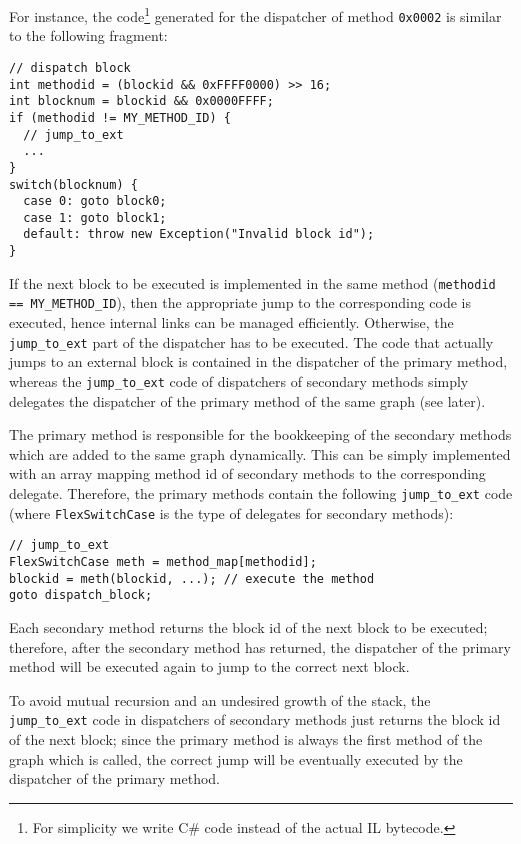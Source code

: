 For instance, the code\footnote{For simplicity we write C\# code instead of
the actual IL bytecode.} generated for the dispatcher of method \texttt{0x0002}
is similar to the following fragment: 
\begin{small}
\begin{lstlisting}[language={[Sharp]C}]
// dispatch block
int methodid = (blockid && 0xFFFF0000) >> 16; 
int blocknum = blockid && 0x0000FFFF;         
if (methodid != MY_METHOD_ID) {
  // jump_to_ext 
  ...
}
switch(blocknum) {
  case 0: goto block0;
  case 1: goto block1;
  default: throw new Exception("Invalid block id");
}
\end{lstlisting}
\end{small}
If the next block to be executed is implemented in the same method
({\small\lstinline{methodid == MY_METHOD_ID}}), then the appropriate
jump to the corresponding code is executed, hence internal links
can be managed efficiently.
Otherwise, the \lstinline{jump_to_ext}
part of the dispatcher has to be executed.
The code that actually jumps to an external block is contained in
the dispatcher of the primary method, whereas the
\lstinline{jump_to_ext} code of dispatchers of secondary methods
simply delegates the dispatcher of the primary method of the same
graph (see later).

The primary method is responsible for the bookkeeping of the secondary
methods which are added to the same graph dynamically. This can be 
simply implemented with an array mapping method id of secondary methods
to the corresponding delegate. Therefore, the primary methods contain
the following \lstinline{jump_to_ext} code (where
\lstinline{FlexSwitchCase} is the type of delegates for secondary methods):
\begin{small}
\begin{lstlisting}[language={[Sharp]C}] 
// jump_to_ext
FlexSwitchCase meth = method_map[methodid];
blockid = meth(blockid, ...); // execute the method
goto dispatch_block;
\end{lstlisting}
\end{small}
Each secondary method returns the block id of the next block to be
executed; therefore, after the secondary method has returned, the
dispatcher of the primary method will be executed again to jump
to the correct next block. 

To avoid mutual recursion and an undesired growth of the stack,
the \lstinline{jump_to_ext} code in dispatchers of secondary methods
just returns the block id of the next block; since the primary method
is always the first method of the graph which is called, the correct
jump will be eventually executed by the dispatcher of the primary method.

